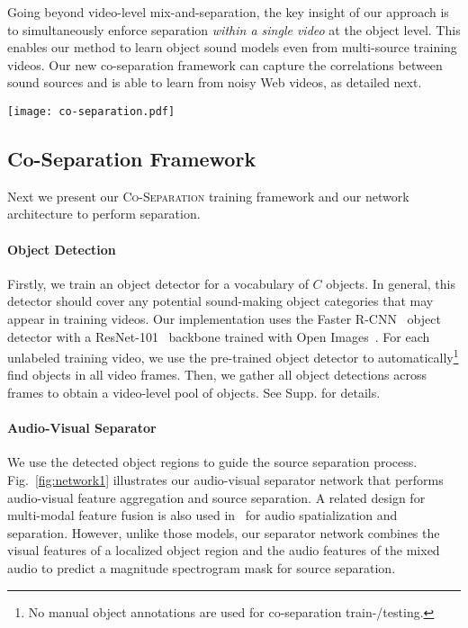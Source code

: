 \documentclass[10pt,twocolumn,letterpaper]{article}
\begin{document}
Going beyond video-level mix-and-separation, the key insight of our approach is to simultaneously enforce separation \emph{within a single video} at the object level. This enables our method to learn object sound models even from multi-source training videos. Our new co-separation framework can capture the correlations between sound sources and is able to learn from noisy Web videos, as detailed next.  

\begin{figure*}[t]
    \center
    \texttt{[image: co-separation.pdf]}
    \caption{Co-separation training pipeline: our object-level co-separation framework first automatically detects objects in a pair of videos, then mixes the audios at the video-level, and separates the sounds for each visual object. The network is trained by minimizing the combination of the co-separation and object-consistency losses defined in Sec.~\ref{sec:network}.}
    \label{fig:network2}
    \vspace*{-0.1in}
\end{figure*}

\subsection{Co-Separation Framework}\label{sec:network}
Next we present our \textsc{Co-Separation} training framework and our network architecture to perform separation.

\vspace*{-0.2in}
\paragraph{Object Detection}
Firstly, we train an object detector for a vocabulary of $C$ objects.  In general, this detector should cover any potential sound-making object categories that may appear in training videos.  Our implementation uses the Faster R-CNN~\cite{ren2015faster} object detector with a ResNet-101~\cite{he2016deep} backbone trained with Open Images~\cite{OpenImages2}.  For each unlabeled training video, we use the pre-trained object detector to automatically\footnote{No manual object annotations are used for co-separation train-/testing.} find objects in all video frames. Then, we gather all object detections across frames to obtain a video-level pool of objects. See Supp. for details.

\vspace*{-0.2in}
\paragraph{Audio-Visual Separator}
We use the detected object regions to guide the source separation process. Fig.~\ref{fig:network1} illustrates our audio-visual separator network that performs audio-visual feature aggregation and source separation. A related design for multi-modal feature fusion is also used in~\cite{gao2019visualsound,morgadoNIPS18,owens2018audio} for audio spatialization and separation. However, unlike those models, our separator network combines the visual features of a localized object region and the audio features of the mixed audio to predict a magnitude spectrogram mask for source separation.
\end{document}
